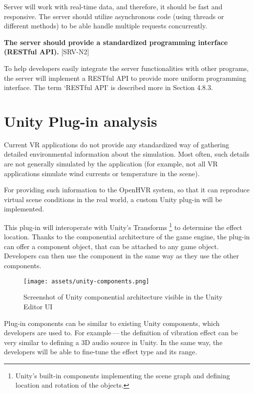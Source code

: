 Server will work with real-time data, and therefore, it should be fast and
responsive. The server should utilize asynchronous code (using threads or 
different methods) to be able handle multiple requests concurrently.

\textbf{The server should provide a standardized programming interface (RESTful API).} [SRV-N2]

To help developers easily integrate the server functionalities with other 
programs, the server will implement a RESTful API to provide more uniform
programming interface. The term `RESTful API' is described more in
Section 4.8.3.


\hypertarget{x-unity-plug-in-analysis}{\section{Unity Plug-in analysis}}
Current VR applications do not provide any standardized way
of gathering detailed environmental information about the simulation.
Most often, such details are not generally simulated by the application
(for example, not all VR applications simulate wind currents or
temperature in the scene).


For providing such information to the OpenHVR system, so that it can
reproduce virtual scene conditions in the real world, a custom Unity plug-in
will be implemented.


This plug-in will interoperate with Unity’s Transforms
\footnote{Unity’s built-in components implementing the scene graph and defining location and rotation of the objects.}
to determine the effect location. Thanks to the
componential architecture of the game engine, the plug-in can offer
a component object, that can be attached to any game object.
Developers can then use the component in the same way as they use the other
components.


\begin{figure}[h]{}
\centering\texttt{[image: assets/unity-components.png]}
\caption{Screenshot of Unity componential architecture visible in the Unity Editor UI}

\end{figure}

Plug-in components can be similar to existing Unity components, which
developers are used to. For example — the definition of vibration effect can be
very similar to defining a 3D audio source in Unity. In the same way, 
the developers will be able to fine-tune the effect type and its range.

